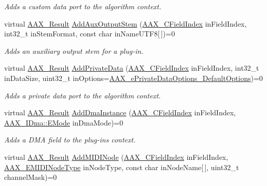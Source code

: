 \begin{DoxyCompactItemize}
\begin{DoxyCompactList}\small\item\em Adds a custom data port to the algorithm context. \end{DoxyCompactList}\item 
virtual \mbox{\hyperlink{a00392_a4d8f69a697df7f70c3a8e9b8ee130d2f}{A\+A\+X\+\_\+\+Result}} \mbox{\hyperlink{a01625_a9207476186fa1b1fb361dd36b242e567}{Add\+Aux\+Output\+Stem}} (\mbox{\hyperlink{a00392_ae807f8986143820cfb5d6da32165c9c7}{A\+A\+X\+\_\+\+C\+Field\+Index}} in\+Field\+Index, int32\+\_\+t in\+Stem\+Format, const char in\+Name\+U\+T\+F8\mbox{[}$\,$\mbox{]})=0
\begin{DoxyCompactList}\small\item\em Adds an auxiliary output stem for a plug-\/in. \end{DoxyCompactList}\item 
virtual \mbox{\hyperlink{a00392_a4d8f69a697df7f70c3a8e9b8ee130d2f}{A\+A\+X\+\_\+\+Result}} \mbox{\hyperlink{a01625_aaec556edd58fea7d4b6c404f7ce1f95c}{Add\+Private\+Data}} (\mbox{\hyperlink{a00392_ae807f8986143820cfb5d6da32165c9c7}{A\+A\+X\+\_\+\+C\+Field\+Index}} in\+Field\+Index, int32\+\_\+t in\+Data\+Size, uint32\+\_\+t in\+Options=\mbox{\hyperlink{a00491_a9f1ef2cb64daf30eaf145dfbb8cd0d00a59458e9bf18919c51e59eb2fd6e84a9a}{A\+A\+X\+\_\+e\+Private\+Data\+Options\+\_\+\+Default\+Options}})=0
\begin{DoxyCompactList}\small\item\em Adds a private data port to the algorithm context. \end{DoxyCompactList}\item 
virtual \mbox{\hyperlink{a00392_a4d8f69a697df7f70c3a8e9b8ee130d2f}{A\+A\+X\+\_\+\+Result}} \mbox{\hyperlink{a01625_aed4d0748c59e03fe18b79b924f7dbaab}{Add\+Dma\+Instance}} (\mbox{\hyperlink{a00392_ae807f8986143820cfb5d6da32165c9c7}{A\+A\+X\+\_\+\+C\+Field\+Index}} in\+Field\+Index, \mbox{\hyperlink{a01809_af8d0f19f2896dd6dbd126b919b24e39b}{A\+A\+X\+\_\+\+I\+Dma\+::\+E\+Mode}} in\+Dma\+Mode)=0
\begin{DoxyCompactList}\small\item\em Adds a D\+MA field to the plug-\/in\textquotesingle{}s context. \end{DoxyCompactList}\item 
virtual \mbox{\hyperlink{a00392_a4d8f69a697df7f70c3a8e9b8ee130d2f}{A\+A\+X\+\_\+\+Result}} \mbox{\hyperlink{a01625_a72b9908f5bbef7d5fb3d259b76861a82}{Add\+M\+I\+D\+I\+Node}} (\mbox{\hyperlink{a00392_ae807f8986143820cfb5d6da32165c9c7}{A\+A\+X\+\_\+\+C\+Field\+Index}} in\+Field\+Index, \mbox{\hyperlink{a00491_a5e1dffce35d05990dbbad651702678e4}{A\+A\+X\+\_\+\+E\+M\+I\+D\+I\+Node\+Type}} in\+Node\+Type, const char in\+Node\+Name\mbox{[}$\,$\mbox{]}, uint32\+\_\+t channel\+Mask)=0

\end{DoxyCompactItemize}
